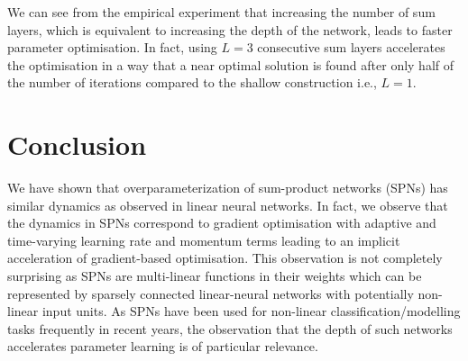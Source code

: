 \documentclass{article}
\begin{document}
We can see from the empirical experiment that increasing the number of sum layers, which is equivalent to increasing the depth of the network, leads to faster parameter optimisation.
In fact, using $L=3$ consecutive sum layers accelerates the optimisation in a way that a near optimal solution is found after only half of the number of iterations compared to the shallow construction i.e., $L=1$.

\section{Conclusion} \label{sec:conclusion}
We have shown that overparameterization of sum-product networks (SPNs) has similar dynamics as observed in linear neural networks.
In fact, we observe that the dynamics in SPNs correspond to gradient optimisation with adaptive and time-varying learning rate and momentum terms leading to an implicit acceleration of gradient-based optimisation.
This observation is not completely surprising as SPNs are multi-linear functions in their weights which can be represented by sparsely connected linear-neural networks with potentially non-linear input units.
As SPNs have been used for non-linear classification/modelling tasks frequently in recent years, the observation that the depth of such networks accelerates parameter learning is of particular relevance.




\end{document}
